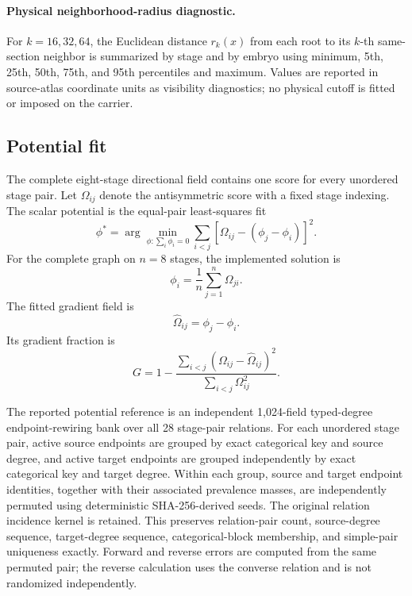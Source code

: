 \documentclass[11pt]{article}
\begin{document}
\paragraph{Physical neighborhood-radius diagnostic.}
For \(k=16,32,64\), the Euclidean distance \(r_k(x)\) from each root to its \(k\)-th same-section neighbor is summarized by stage and by embryo using minimum, 5th, 25th, 50th, 75th, and 95th percentiles and maximum. Values are reported in source-atlas coordinate units as visibility diagnostics; no physical cutoff is fitted or imposed on the carrier.

\subsection{Potential fit}

The complete eight-stage directional field contains one score for every unordered stage pair. Let \(\Omega_{ij}\) denote the antisymmetric score with a fixed stage indexing. The scalar potential is the equal-pair least-squares fit
\begin{equation}
\phi^\ast
=
\arg\min_{\phi:\sum_i\phi_i=0}
\sum_{i<j}
\left[
\Omega_{ij}
-
(\phi_j-\phi_i)
\right]^2.
\label{eq:potentialfit}
\end{equation}
For the complete graph on \(n=8\) stages, the implemented solution is
\[
\phi_i
=
\frac1n
\sum_{j=1}^{n}\Omega_{ji}.
\]
The fitted gradient field is
\[
\widehat\Omega_{ij}
=
\phi_j-\phi_i.
\]
Its gradient fraction is
\begin{equation}
G
=
1-
\frac{
\sum_{i<j}
(\Omega_{ij}-\widehat\Omega_{ij})^2
}{
\sum_{i<j}\Omega_{ij}^2
}.
\label{eq:gradientfraction}
\end{equation}

The reported potential reference is an independent 1,024-field typed-degree endpoint-rewiring bank over all 28 stage-pair relations. For each unordered stage pair, active source endpoints are grouped by exact categorical key and source degree, and active target endpoints are grouped independently by exact categorical key and target degree. Within each group, source and target endpoint identities, together with their associated prevalence masses, are independently permuted using deterministic SHA-256-derived seeds. The original relation incidence kernel is retained. This preserves relation-pair count, source-degree sequence, target-degree sequence, categorical-block membership, and simple-pair uniqueness exactly. Forward and reverse errors are computed from the same permuted pair; the reverse calculation uses the converse relation and is not randomized independently.
\end{document}
